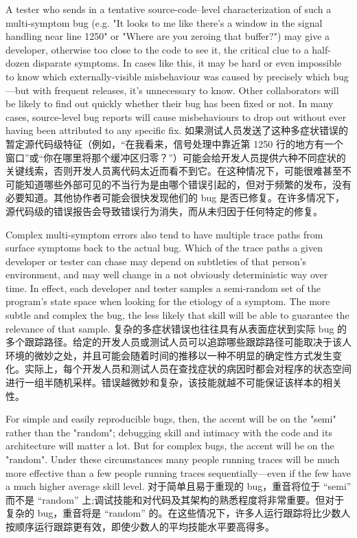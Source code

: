 \documentclass[a4paper,12pt,UTF8,twoside]{ctexbook}
\begin{document}
A tester who sends in a tentative source-code–level characterization of such a multi-symptom bug (e.g. "It looks to me like there's a window in the signal handling near line 1250" or "Where are you zeroing that buffer?") may give a developer, otherwise too close to the code to see it, the critical clue to a half-dozen disparate symptoms. In cases like this, it may be hard or even impossible to know which externally-visible misbehaviour was caused by precisely which bug—but with frequent releases, it's unnecessary to know. Other collaborators will be likely to find out quickly whether their bug has been fixed or not. In many cases, source-level bug reports will cause misbehaviours to drop out without ever having been attributed to any specific fix.
如果测试人员发送了这种多症状错误的暂定源代码级特征（例如，“在我看来，信号处理中靠近第 1250 行的地方有一个窗口”或“你在哪里将那个缓冲区归零？”）可能会给开发人员提供六种不同症状的关键线索，否则开发人员离代码太近而看不到它。在这种情况下，可能很难甚至不可能知道哪些外部可见的不当行为是由哪个错误引起的，但对于频繁的发布，没有必要知道。其他协作者可能会很快发现他们的 bug 是否已修复。在许多情况下，源代码级的错误报告会导致错误行为消失，而从未归因于任何特定的修复。

Complex multi-symptom errors also tend to have multiple trace paths from surface symptoms back to the actual bug. Which of the trace paths a given developer or tester can chase may depend on subtleties of that person's environment, and may well change in a not obviously deterministic way over time. In effect, each developer and tester samples a semi-random set of the program's state space when looking for the etiology of a symptom. The more subtle and complex the bug, the less likely that skill will be able to guarantee the relevance of that sample.
复杂的多症状错误也往往具有从表面症状到实际 bug 的多个跟踪路径。给定的开发人员或测试人员可以追踪哪些跟踪路径可能取决于该人环境的微妙之处，并且可能会随着时间的推移以一种不明显的确定性方式发生变化。实际上，每个开发人员和测试人员在查找症状的病因时都会对程序的状态空间进行一组半随机采样。错误越微妙和复杂，该技能就越不可能保证该样本的相关性。

For simple and easily reproducible bugs, then, the accent will be on the "semi" rather than the "random"; debugging skill and intimacy with the code and its architecture will matter a lot. But for complex bugs, the accent will be on the "random". Under these circumstances many people running traces will be much more effective than a few people running traces sequentially—even if the few have a much higher average skill level.
对于简单且易于重现的 bug，重音将位于 “semi” 而不是 “random” 上;调试技能和对代码及其架构的熟悉程度将非常重要。但对于复杂的 bug，重音将是 “random” 的。在这些情况下，许多人运行跟踪将比少数人按顺序运行跟踪更有效，即使少数人的平均技能水平要高得多。
\end{document}
